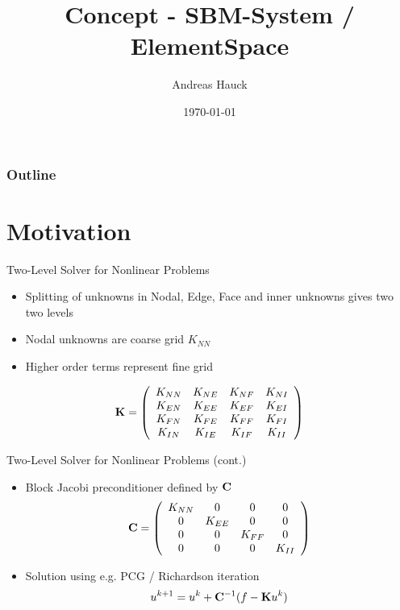\documentclass[10pt]{beamer}
\title{Concept - SBM-System / ElementSpace }
\author{Andreas Hauck}
\date{\today}
\begin{document}
\begin{frame}
 \titlepage 
\end{frame}


\begin{frame}
\frametitle{Outline}
\tableofcontents
\end{frame}


\section{Motivation}
\begin{frame}[fragile]{Two-Level Solver for Nonlinear Problems}
\begin{itemize} 
\item Splitting of unknowns in Nodal, Edge, Face and inner unknowns gives two
two levels
\item Nodal unknowns are coarse grid $K_{NN}$
\item Higher order terms represent fine grid
\end{itemize}
\begin{equation}
{\bf K} = \left(
\begin{array}{cccc}
K_{NN} & K_{NE} & K_{NF} & K_{NI} \\
K_{EN} & K_{EE} & K_{EF} & K_{EI} \\
K_{FN} & K_{FE} & K_{FF} & K_{FI} \\
K_{IN} & K_{IE} & K_{IF} & K_{II} \\
\end{array} \right)
\end{equation}
\end{frame}

\begin{frame}[fragile]{Two-Level Solver for Nonlinear Problems (cont.)}
 \begin{itemize}
  \item Block Jacobi preconditioner defined by ${\bf C}$
\[ \displaystyle
{\bf C} = \left(
\begin{array}{cccc}
K_{NN} & 0 & 0 & 0 \\
0 & K_{EE} & 0 & 0 \\
0 & 0 & K_{FF} & 0 \\
0 & 0 & 0 & K_{II} \\
\end{array} \right)
\]
\item Solution using e.g. PCG / Richardson iteration
\[ \displaystyle
 u^{k+1} = u^k + {\bf C}^{-1} (f-{\bf K}u^k)
\]
 \end{itemize}
\end{frame}
\end{document}
